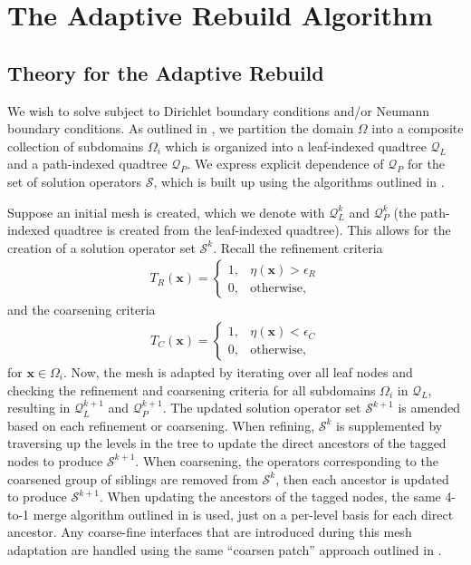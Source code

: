 \section{The Adaptive Rebuild Algorithm}
\label{sec:adaptive-rebuild-algorithm}

\subsection{Theory for the Adaptive Rebuild}

We wish to solve  subject to Dirichlet boundary conditions and/or Neumann boundary conditions. As outlined in , we partition the domain $\Omega$ into a composite collection of subdomains $\Omega_i$ which is organized into a leaf-indexed quadtree $\mathcal{Q}_{L}$ and a path-indexed quadtree $\mathcal{Q}_{P}$. We express explicit dependence of $\mathcal{Q}_{P}$ for the set of solution operators $\mathcal{S}$, which is built up using the algorithms outlined in .

Suppose an initial mesh is created, which we denote with $\mathcal{Q}^{k}_{L}$ and $\mathcal{Q}^{k}_{P}$ (the path-indexed quadtree is created from the leaf-indexed quadtree). This allows for the creation of a solution operator set $\mathcal{S}^{k}$. Recall the refinement criteria
\begin{align}
    T_{R} (\textbf{x}) =
    \begin{cases}
        1,& \eta(\textbf{x}) > \epsilon_{R} \\
        0,& \text{otherwise},
    \end{cases}
\end{align}
and the coarsening criteria
\begin{align}
    T_{C} (\textbf{x}) =
    \begin{cases}
        1,& \eta(\textbf{x}) < \epsilon_{C} \\
        0,& \text{otherwise},
    \end{cases}
\end{align}
for $\textbf{x} \in \Omega_i$. Now, the mesh is adapted by iterating over all leaf nodes and checking the refinement and coarsening criteria for all subdomains $\Omega_i$ in $\mathcal{Q}_{L}$, resulting in $\mathcal{Q}^{k+1}_{L}$ and $\mathcal{Q}^{k+1}_{P}$. The updated solution operator set $\mathcal{S}^{k+1}$ is amended based on each refinement or coarsening. When refining, $\mathcal{S}^{k}$ is supplemented by traversing up the levels in the tree to update the direct ancestors of the tagged nodes to produce $\mathcal{S}^{k+1}$. When coarsening, the operators corresponding to the coarsened group of siblings are removed from $\mathcal{S}^{k}$, then each ancestor is updated to produce $\mathcal{S}^{k+1}$. When updating the ancestors of the tagged nodes, the same 4-to-1 merge algorithm outlined in  is used, just on a per-level basis for each direct ancestor. Any coarse-fine interfaces that are introduced during this mesh adaptation are handled using the same ``coarsen patch'' approach outlined in .

